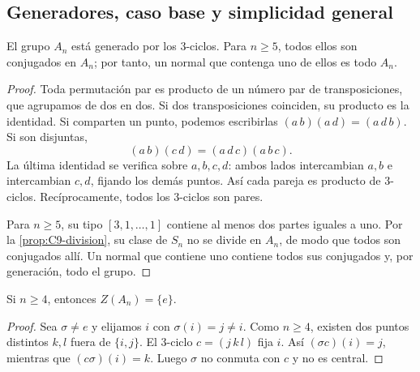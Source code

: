 \subsection{Generadores, caso base y simplicidad general}\label{tema:9-3-2}
\begin{lema}\label{lema:C9-tres-ciclos}
El grupo $A_n$ está generado por los $3$-ciclos. Para $n\ge5$, todos ellos son conjugados en $A_n$; por tanto, un normal que contenga uno de ellos es todo $A_n$.
\end{lema}
\begin{proof}
Toda permutación par es producto de un número par de transposiciones, que agrupamos de dos en dos. Si dos transposiciones coinciden, su producto es la identidad. Si comparten un punto, podemos escribirlas $(a\,b)(a\,d)=(a\,d\,b)$. Si son disjuntas,
\[
(a\,b)(c\,d)=(a\,d\,c)(a\,b\,c).
\]
La última identidad se verifica sobre $a,b,c,d$: ambos lados intercambian $a,b$ e intercambian $c,d$, fijando los demás puntos. Así cada pareja es producto de $3$-ciclos. Recíprocamente, todos los $3$-ciclos son pares.

Para $n\ge5$, su tipo $[3,1,\ldots,1]$ contiene al menos dos partes iguales a uno. Por la \cref{prop:C9-division}, su clase de $S_n$ no se divide en $A_n$, de modo que todos son conjugados allí. Un normal que contiene uno contiene todos sus conjugados y, por generación, todo el grupo.
\end{proof}

\begin{lema}\label{lema:C9-centro}
Si $n\ge4$, entonces $Z(A_n)=\{e\}$.
\end{lema}
\begin{proof}
Sea $\sigma\ne e$ y elijamos $i$ con $\sigma(i)=j\ne i$. Como $n\ge4$, existen dos puntos distintos $k,l$ fuera de $\{i,j\}$. El $3$-ciclo $c=(j\,k\,l)$ fija $i$. Así $(\sigma c)(i)=j$, mientras que $(c\sigma)(i)=k$. Luego $\sigma$ no conmuta con $c$ y no es central.
\end{proof}

